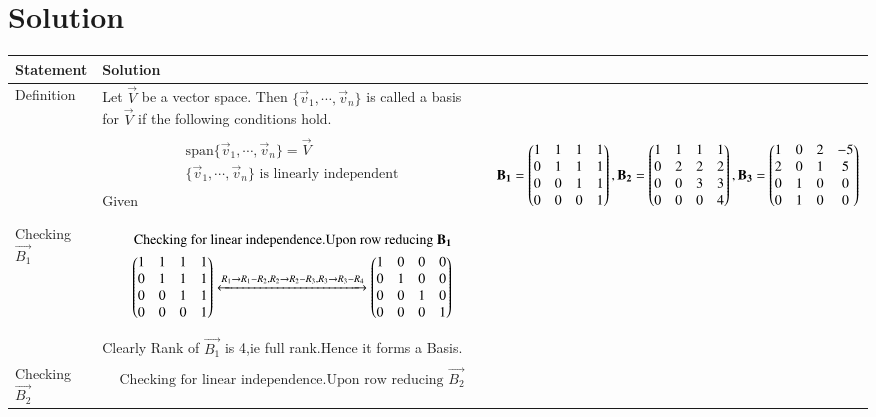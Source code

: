 \documentclass[journal,12pt,onecolumn]{IEEEtran}
\begin{document}
\section{Solution}
\begin{longtable}{|p{5cm}|p{13cm}|}
\hline
\textbf{Statement} &\textbf{Solution}\\
\hline
Definition & Let $\vec{V}$  be a vector space. Then  $\{\vec{v}_{1},\cdots ,\vec{v}_{n}\}$  is called a basis for  $\vec{V}$ if the following conditions hold. \\
& \parbox{12cm}{\begin{align}
    \text{span} \{\vec{v}_{1},\cdots ,\vec{v}_{n}\}=\vec{V}\\
    \{\vec{v}_{1},\cdots ,\vec{v}_{n}\} \text{ is linearly independent}\\
\end{align}}
\hline
Given &
\parbox{12cm}{\begin{align}
    \mathbf{B_1}=\begin{pmatrix}1&1&1&1\\0&1&1&1\\0&0&1&1\\0&0&0&1\end{pmatrix},  \mathbf{B_2}=\begin{pmatrix}1&1&1&1\\0&2&2&2\\0&0&3&3\\0&0&0&4\end{pmatrix},
    \mathbf{B_3}=\begin{pmatrix}1&0&2&-5\\2&0&1&5\\0&1&0&0\\0&1&0&0\end{pmatrix}
\end{align}}\\
\hline
Checking $\vec{B_1}$  &
\parbox{12cm}{\begin{align}\text{Checking for linear independence.}
 \text{Upon row reducing }\mathbf{B_1}\\ \begin{pmatrix}1&1&1&1\\0&1&1&1\\0&0&1&1\\0&0&0&1\end{pmatrix}\xleftrightarrow[]{R_1\rightarrow R_1-R_2,R_2\rightarrow R_2-R_3,R_3\rightarrow R_3-R_4}
  \begin{pmatrix}1&0&0&0\\0&1&0&0\\0&0&1&0\\0&0&0&1\end{pmatrix}
\end{align}}\\
&Clearly Rank of $\vec{B_1}$ is 4,ie full rank.Hence it forms a Basis.\\
\hline
Checking $\vec{B_2}$&
\parbox{12cm}{\begin{align}\text{Checking for linear independence.}
  \text{Upon row reducing }\vec{B_2}\\

\end{align}}
\end{longtable}
\end{document}
